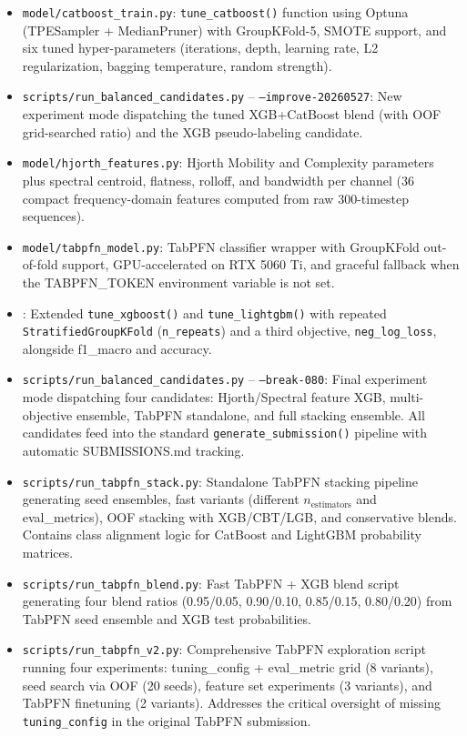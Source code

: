 \documentclass[12pt, a4paper]{article}
\newcommand{\filepath}[1]{\texttt{\seqsplit{#1}}}
\begin{document}
\begin{itemize}
    \item \texttt{model/catboost\_train.py}: \texttt{tune\_catboost()} function using Optuna (TPESampler + MedianPruner) with GroupKFold-5, SMOTE support, and six tuned hyper-parameters (iterations, depth, learning rate, L2 regularization, bagging temperature, random strength).
    \item \texttt{scripts/run\_balanced\_candidates.py} -- \texttt{--improve-20260527}: New experiment mode dispatching the tuned XGB+CatBoost blend (with OOF grid-searched ratio) and the XGB pseudo-labeling candidate.
    \item \texttt{model/hjorth\_features.py}: Hjorth Mobility and Complexity parameters plus spectral centroid, flatness, rolloff, and bandwidth per channel (36 compact frequency-domain features computed from raw 300-timestep sequences).
    \item \texttt{model/tabpfn\_model.py}: TabPFN classifier wrapper with GroupKFold out-of-fold support, GPU-accelerated on RTX 5060 Ti, and graceful fallback when the TABPFN\_TOKEN environment variable is not set.
    \item \filepath{model/train.py}: Extended \texttt{tune\_xgboost()} and \texttt{tune\_lightgbm()} with repeated \texttt{StratifiedGroupKFold} (\texttt{n\_repeats}) and a third objective, \texttt{neg\_log\_loss}, alongside f1\_macro and accuracy.
    \item \texttt{scripts/run\_balanced\_candidates.py} -- \texttt{--break-080}: Final experiment mode dispatching four candidates: Hjorth/Spectral feature XGB, multi-objective ensemble, TabPFN standalone, and full stacking ensemble. All candidates feed into the standard \texttt{generate\_submission()} pipeline with automatic SUBMISSIONS.md tracking.
    \item \texttt{scripts/run\_tabpfn\_stack.py}: Standalone TabPFN stacking pipeline generating seed ensembles, fast variants (different $n_{\text{estimators}}$ and eval\_metrics), OOF stacking with XGB/CBT/LGB, and conservative blends. Contains class alignment logic for CatBoost and LightGBM probability matrices.
    \item \texttt{scripts/run\_tabpfn\_blend.py}: Fast TabPFN + XGB blend script generating four blend ratios (0.95/0.05, 0.90/0.10, 0.85/0.15, 0.80/0.20) from TabPFN seed ensemble and XGB test probabilities.
    \item \texttt{scripts/run\_tabpfn\_v2.py}: Comprehensive TabPFN exploration script running four experiments: tuning\_config + eval\_metric grid (8 variants), seed search via OOF (20 seeds), feature set experiments (3 variants), and TabPFN finetuning (2 variants). Addresses the critical oversight of missing \texttt{tuning\_config} in the original TabPFN submission.
\end{itemize}
\end{document}
